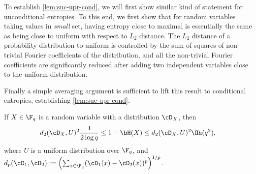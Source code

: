 \documentclass[11pt]{article}
\begin{document}
To establish \cref{lem:suc-upr-cond}, we will first show similar kind of statement for unconditional entropies. To this end, we first show that for random variables taking values in \emph{small} set, having entropy close to maximal is essentially the same as being close to uniform with respect to $L_2$ distance. The $L_2$ distance of a probability distribution to uniform is controlled by the sum of squares of non-trivial Fourier coefficients of the distribution, and all the non-trivial Fourier coefficients are significantly reduced after adding two independent variables close to the uniform distribution.

Finally a simple averaging argument is sufficient to lift this result to conditional entropies, establishing \cref{lem:suc-upr-cond}.


\begin{lemma}
	\label{lem:kl-l2-comparable}
	If $X \in \F_q$ is a random variable with a distribution $\cD_X$, then
	\[d_2(\cD_X, U)^2 \frac{1}{2 \log q} \leq 1 - \bH(X) \leq d_2(\cD_X, U)^2 \Oh(q^2),\]
	where $U$ is a uniform distribution over $\F_q$, and $d_p(\cD_1, \cD_2) := \left(\sum_{x \in \F_q} (\cD_1(x) - \cD_2(x))^p\right)^{1/p}$.
\end{lemma}
\end{document}
